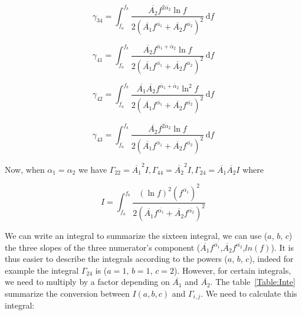 \documentclass[a4paper,12pt]{article}
\begin{document}
\begin{equation}
    \gamma_{34} =  \int_{f_a}^{f_b} \frac{\overline{A_2}f^{2 \overline{ \alpha_2}} \ln f}{2(\overline{A_1}f^{\overline{ \alpha_1}} +\overline{A_2}f^{\overline{ \alpha_2}})^2} \, \mathrm{d}f 
\end{equation}

\begin{equation}
    \gamma_{41} =  \int_{f_a}^{f_b} \frac{ \overline{A_2} f^{\overline{ \alpha}_1 + \overline{ \alpha}_2}  \ln f}{2(\overline{A_1}f^{\overline{ \alpha_1}} + \overline{A_2}f^{\overline{ \alpha_2}})^2} \, \mathrm{d}f 
\end{equation}

\begin{equation}
    \gamma_{42} =  \int_{f_a}^{f_b} \frac{ \overline{A_1} \overline{A_2} f^{\overline{ \alpha}_1 + \overline{ \alpha}_2}  \ln ^2 f}{2(\overline{A_1}f^{\overline{ \alpha_1}} +\overline{A_2}f^{\overline{ \alpha_2}})^2} \, \mathrm{d}f 
\end{equation}

\begin{equation}\label{eq:gamma43}
    \gamma_{43} =  \int_{f_a}^{f_b} \frac{ \overline{A_2} f^{\overline{2 \alpha}_2}  \ln f}{2(\overline{A_1}f^{\overline{ \alpha_1}} +\overline{A_2}f^{\overline{ \alpha_2}})^2} \, \mathrm{d}f 
\end{equation}

Now, when $\alpha_1 = \alpha_2$ we have $\Gamma_{22} = \overline{A_1}^2 I, \Gamma_{44} = \overline{A_2}^2 I, \Gamma_{24} = \overline{A_1} \overline{A_2} I$ where 

\begin{equation}
    I = \int_{f_a}^{f_b} \frac{(\ln f)^2 (f^{\overline{\alpha_1}})^2}{2 (\overline{A_1}f^{\overline{ \alpha_1}} +\overline{A_2}f^{\overline{ \alpha_2}})^2}
\end{equation}

We can write an integral to summarize the sixteen integral, we can use ($ a $, $ b $, $ c $) the three slopes of the three numerator's component  ($\overline{A_1}f^{\overline{\alpha_1}}$,$\overline{A_2}f^{\overline{\alpha_2}}$,$ln(f)$). It is thus easier to describe the integrals according to the powers ($ a $, $ b $, $ c $), indeed for example the integral $\Gamma_{24}$ is ($ a= 1 $, $ b = 1 $, $ c =2 $). However, for certain integrals, we need to multiply by a factor depending on $\overline{A_1}$ and $\overline{A_2}$. The table~\ref{Table:Inte} summarize the conversion between $I(a,b,c)$ and $\Gamma_{i,j}$. We need to calculate this integral:
\end{document}
